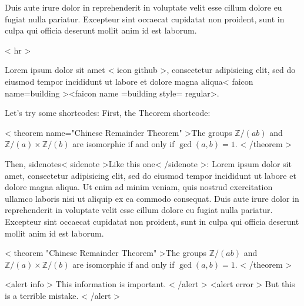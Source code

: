 \documentclass[12pt]{article}
\theoremstyle{TheoremStyle}
\begin{document}
	

\begin{markdown}
Duis aute irure dolor in reprehenderit in voluptate velit esse cillum dolore eu fugiat nulla pariatur. Excepteur sint occaecat cupidatat non proident, sunt in culpa qui officia deserunt mollit anim id est laborum. 
    
{{< hr >}}
    
    
Lorem ipsum dolor sit amet {{< icon github >}}, consectetur adipisicing elit, sed do eiusmod tempor incididunt ut labore et dolore magna aliqua{{< faicon name=building  >}}{{<faicon name =building style=   regular>}}.
    
Let's try some shortcodes: First, the Theorem shortcode:

{{< theorem name="Chinese Remainder Theorem" >}}The groups $\mathbb{Z}/(ab)$ and $\mathbb{Z}/(a)\times \mathbb{Z}/(b)$ are isomorphic if and only if $\gcd(a,b)=1$.
{{< /theorem >}}

Then, sidenotes{{< sidenote >}}Like this one{{< /sidenote >}}: Lorem ipsum dolor sit amet, consectetur adipisicing elit, sed do eiusmod tempor incididunt ut labore et dolore magna aliqua. Ut enim ad minim veniam, quis nostrud exercitation ullamco laboris nisi ut aliquip ex ea commodo consequat. Duis aute irure dolor in reprehenderit in voluptate velit esse cillum dolore eu fugiat nulla pariatur. Excepteur sint occaecat cupidatat non proident, sunt in culpa qui officia deserunt mollit anim id est laborum. 

{{< theorem "Chinese Remainder Theorem" >}}The groups $\mathbb{Z}/(ab)$ and $\mathbb{Z}/(a)\times \mathbb{Z}/(b)$ are isomorphic if and only if $\gcd(a,b)=1$.
{{< /theorem >}}


{{<alert info >}}
This information is important.
{{< /alert >}}
{{<alert error >}}
But this is a terrible mistake.
{{< /alert >}}





\end{markdown}
\end{document}
